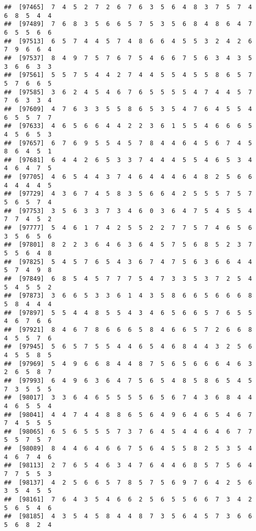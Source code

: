 \documentclass[
]{book}
\begin{document}
\begin{verbatim}
##  [97465]  7  4  5  2  7  2  6  7  6  3  5  6  4  8  3  7  5  7  4  6  8  5  4  4
##  [97489]  7  6  8  3  5  6  6  5  7  5  3  5  6  8  4  8  6  4  7  6  5  5  6  6
##  [97513]  6  5  7  4  4  5  7  4  8  6  6  4  5  5  3  2  4  2  6  7  9  6  6  4
##  [97537]  8  4  9  7  5  7  6  7  5  4  6  6  7  5  6  3  4  3  5  3  6  6  3  3
##  [97561]  5  5  7  5  4  4  2  7  4  4  5  5  4  5  5  8  6  5  7  5  7  6  6  5
##  [97585]  3  6  2  4  5  4  6  7  6  5  5  5  5  4  7  4  4  5  7  7  6  3  3  4
##  [97609]  4  7  6  3  3  5  5  8  6  5  3  5  4  7  6  4  5  5  4  6  5  5  7  7
##  [97633]  4  6  5  6  6  4  4  2  2  3  6  1  5  5  4  6  6  6  5  4  5  6  5  3
##  [97657]  6  7  6  9  5  5  4  5  7  8  4  4  6  4  5  6  7  4  5  8  6  4  5  1
##  [97681]  6  4  4  2  6  5  3  3  7  4  4  4  5  5  4  6  5  3  4  4  6  4  7  5
##  [97705]  4  6  5  4  4  3  7  4  6  4  4  4  6  4  8  2  5  6  6  4  4  4  4  5
##  [97729]  4  3  6  7  4  5  8  3  5  6  6  4  2  5  5  5  7  5  7  5  6  5  7  4
##  [97753]  3  5  6  3  3  7  3  4  6  0  3  6  4  7  5  4  5  5  4  7  7  4  5  2
##  [97777]  5  4  6  1  7  4  2  5  5  2  2  7  7  5  7  4  6  5  6  3  5  6  5  6
##  [97801]  8  2  2  3  6  4  6  3  6  4  5  7  5  6  8  5  2  3  7  5  5  6  4  8
##  [97825]  5  4  5  7  6  5  4  3  6  7  4  7  5  6  3  6  6  4  4  5  7  4  9  8
##  [97849]  6  8  5  4  5  7  7  7  5  4  7  3  3  5  3  7  2  5  4  5  4  5  5  2
##  [97873]  3  6  6  5  3  3  6  1  4  3  5  8  6  6  5  6  6  6  8  5  8  4  4  4
##  [97897]  5  5  4  4  8  5  5  4  3  4  6  5  6  6  5  7  6  5  5  4  6  7  6  6
##  [97921]  8  4  6  7  8  6  6  6  5  8  4  6  6  5  7  2  6  6  8  4  5  5  7  6
##  [97945]  5  6  5  7  5  5  4  4  6  5  4  6  8  4  4  3  2  5  6  4  5  5  8  5
##  [97969]  5  4  9  6  6  8  4  4  8  7  5  6  5  6  6  6  4  6  3  2  6  5  8  7
##  [97993]  6  4  9  6  3  6  4  7  5  6  5  4  8  5  8  6  5  4  5  7  3  5  5  5
##  [98017]  3  3  6  4  6  5  5  5  5  6  5  6  7  4  3  6  8  4  4  4  6  5  5  4
##  [98041]  4  4  7  4  4  8  8  6  5  6  4  9  6  4  6  5  4  6  7  7  4  5  5  5
##  [98065]  6  5  6  5  5  5  7  3  7  6  4  5  4  4  6  4  6  7  7  5  5  7  5  7
##  [98089]  8  4  4  6  4  6  6  7  5  6  4  5  5  8  2  5  3  5  4  4  6  7  4  6
##  [98113]  2  7  6  5  4  6  3  4  7  6  4  4  6  8  5  7  5  6  4  7  7  5  5  3
##  [98137]  4  2  5  6  6  5  7  8  5  7  5  6  9  7  6  4  2  5  6  3  5  4  5  5
##  [98161]  7  6  4  3  5  4  6  6  2  5  6  5  5  6  6  7  3  4  2  5  6  5  4  6
##  [98185]  4  3  5  4  5  8  4  4  8  7  3  5  6  4  5  7  3  6  6  5  6  8  2  4

\end{verbatim}
\end{document}
